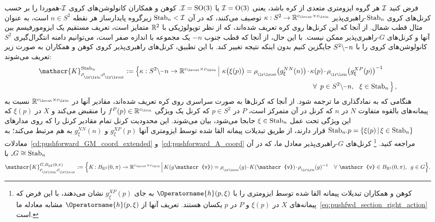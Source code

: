 فرض کنید $\mathcal{I}$ هر گروه ایزومتری متعدی از کره باشد، یعنی $\mathcal{I}=\operatorname{O}(3)$ یا $\mathcal{I}=\operatorname{SO}(3)$.
کوهن و همکاران\cite{Cohen2019-generaltheory} کانولوشن‌های کروی $\mathcal{I}$-هموردا را بر حسب کرنل‌های کروی $\operatorname{Stab}_{n}$-راهبری‌پذیر ${\kappa: S^2 \to \R^{\cout\times\cin}}$ توصیف می‌کنند، که در آن $\operatorname{Stab}_{n} < \mathcal{I}$ زیرگروه پایدارساز هر نقطه $n\in S^2$ است، به عنوان مثال قطب شمال.
از آنجا که این کرنل‌ها روی کره تعریف شده‌اند، که از نظر توپولوژیکی با $\mathbb{R}^2$ متمایز است، تعریف مستقیم یک ایزومورفیسم بین آنها و کرنل‌های $G$-راهبری‌پذیر ممکن نیست.
با این حال، از آنجا که قطب جنوب $-n$ یک مجموعه با اندازه صفر است، می‌توانیم دامنه انتگرال‌گیری $S^2$ کانولوشن‌های کروی را با $S^2\backslash \mkern-1mu\minus\mkern1mu n$ جایگزین کنیم بدون اینکه نتیجه تغییر کند.
با این تطبیق، کرنل‌های راهبری‌پذیر کروی کوهن و همکاران\cite{Cohen2019-generaltheory} به صورت زیر تعریف می‌شوند:
\begin{align}\label{eq:spherical_steerable_kernel_space}
	\mathscr{K}^{\Stab{n}}_{\rhoin\mkern-1mu,\rhoout}
	:= \pig\{ \kappa: S^2\backslash \mkern-1mu\minus\mkern1mu n \to \R^{\cout\times\cin}
	\,\pig|\ \kappa\big(\xi (p)\big) = \rhoout\big( g_\xi^{NN}(n) \big) \mkern-1.5mu\cdot\mkern-1.5mu \kappa(p) \mkern-1.5mu\cdot\mkern-1.5mu \rhoin\big( g_\xi^{XP}(p) \big)^{-1}
	\qquad \\ \notag
	\forall\,\ p\in S^2\backslash \mkern-1mu\minus\mkern1mu n,\ \ \xi\in\Stab{n} \pig\} \,,
\end{align}
هنگامی که به نمادگذاری ما ترجمه شود.
از آنجا که کرنل‌ها به صورت سراسری روی کره تعریف شده‌اند، مقادیر آنها در $\R^{\cout\times\cin}$ نسبت به پیمانه‌های بالقوه متفاوت $N$ در $n$ که کرنل در آن متمرکز است، $P$ در $p\in S^2$ که کرنل یک ویژگی $f^P(p) \in \R^\cin$ را منقبض می‌کند و $X$ در $\xi(p)$ که این ویژگی تحت عمل $\xi \in \operatorname{Stab}_{n}$ جابجا می‌شود، بیان می‌شوند.
این محدودیت کرنل تمام مقادیر کرنل را که روی مدارهای ${\operatorname{Stab}_{n}\mkern-4mu.\mkern1mup} = \{ \xi(p) \,|\, \xi\in\operatorname{Stab}_{n} \}$ قرار دارند، از طریق تبدیلات پیمانه القا شده توسط ایزومتری آنها $g_\xi^{XP}(p)$ و $g_\xi^{NN}(n)$ به هم مرتبط می‌کند؛ به معادلات~\eqref{cd:pushforward_GM_coord_extended} و~\eqref{cd:pushforward_A_coord} مراجعه کنید.%
\footnote{
	کوهن و همکاران\cite{Cohen2019-generaltheory} تبدیلات پیمانه القا شده توسط ایزومتری را با $\Operatorname{h}(p,\xi)$ به جای $g_\xi^{XP}(p)$ نشان می‌دهند، با این فرض که پیمانه‌های $X$ در $\xi(p)$ و $P$ در $p$ یکسان هستند.
	تعریف آنها از $\Operatorname{h}(p,\xi)$ مشابه معادله ما~\eqref{eq:pushfwd_section_right_action} است.
}
کرنل‌های $G$-راهبری‌پذیر معادل ما، که در آن $G \cong \operatorname{Stab}_{n}$، با
\begin{align}\label{eq:G_steer_kernel_space_open_ball_pi}
	\mathscr{K}^{G,B_{\R^2}(0,\pi)}_{\rhoin\mkern-1mu,\rhoout}
	:= \Big\{ K\!: B_{\R^2}(0,\pi) \to \R^{\cout\times\cin} \mkern1.5mu\Big|\,
	K(g\mkern1mu \mathscr{v}) =
	\rhoout(g) \mkern-2mu\cdot\mkern-2mu K(\mathscr{v}) \mkern-2mu\cdot\mkern-2mu \rhoin(g)^{-1} \ \ \ \forall\ \mathscr{v}\in B_{\R^2}(0,\pi),\,\ g\in G \Big\} .
\end{align}
